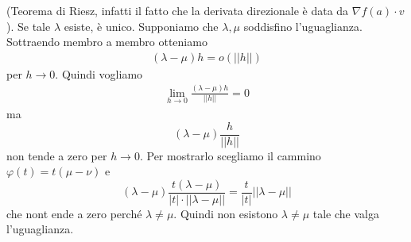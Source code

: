 \documentclass[a4paper]{article}
\begin{document}
(Teorema di Riesz, infatti il fatto che la derivata direzionale è data da \(\nabla f(a) \cdot v\)).
Se tale \(\lambda\) esiste, è unico.
Supponiamo che \(\lambda,\mu\) soddisfino l'uguaglianza.
Sottraendo membro a membro otteniamo
\begin{align*}
    (\lambda - \mu) h = o(||h||)
\end{align*}
per \(h\to 0\).
Quindi vogliamo
\begin{align*}
    \lim_{h\to 0} \frac{(\lambda - \mu)h}{||h||} = 0
\end{align*}
ma 
\[
    (\lambda - \mu) \frac{h}{||h||}
\]
non tende a zero per \(h\to 0\).
Per mostrarlo scegliamo il cammino \(\varphi(t) = t(\mu-\nu)\) e
\[
    (\lambda - \mu) \frac{t(\lambda - \mu)}{|t| \cdot ||\lambda - \mu||}
    = \frac{t}{|t|}||\lambda - \mu||
\]
che nont ende a zero perché \(\lambda \neq \mu\).
Quindi non esistono \(\lambda \neq \mu\) tale che valga l'uguaglianza.

\end{document}
